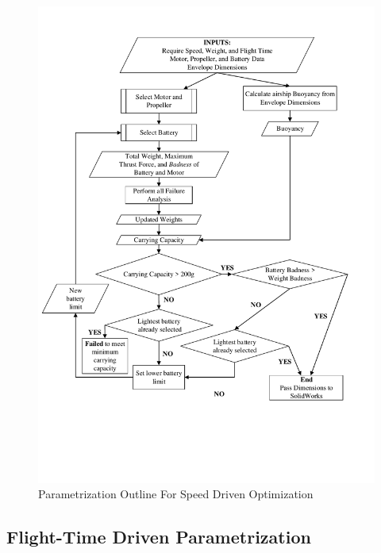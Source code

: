 \documentclass[../main.tex]{subfiles}
\begin{document}
\begin{figure}[H]
	\centering
	\includegraphics[width=\linewidth]{img/paramaterization/speedBased.pdf}
	\caption{Parametrization Outline For Speed Driven Optimization}
	\label{fig:speedDriven}
\end{figure}


\subsection{Flight-Time Driven Parametrization}
\end{document}
